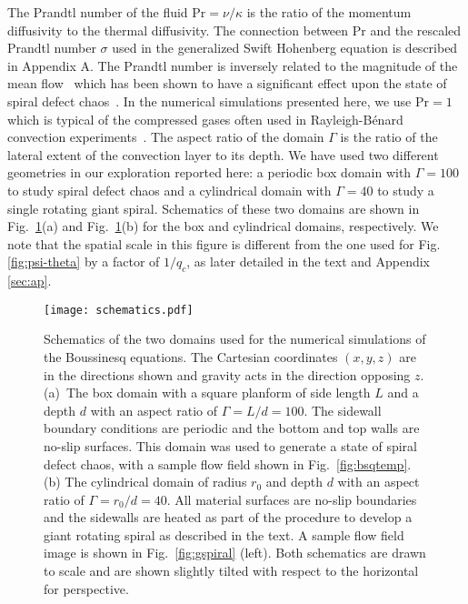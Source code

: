 \documentclass[preprint,prx,floatfix]{revtex4-1}
\begin{document}
The Prandtl number of the fluid $\text{Pr}= {\nu}/{\kappa}$ is the ratio of the momentum diffusivity to the thermal diffusivity. The connection between $\text{Pr}$ and the rescaled Prandtl number $\sigma$ used in the generalized Swift Hohenberg equation is described in Appendix A. The Prandtl number is inversely related to the magnitude of the mean flow~\cite{cross:1984,newell:1990:prl} which has been shown to have a significant effect upon the state of spiral defect chaos~\cite{assenheimer:1994,chiam:2003,karimi:2012,bodenschatz2000}. In the numerical simulations presented here, we use $\text{Pr}=1$ which is typical of the compressed gases often used in Rayleigh-B\'enard convection experiments~\cite{bodenschatz2000,morris1993spiral}.  The aspect ratio of the domain $\Gamma$ is the ratio of the lateral extent of the convection layer to its depth.  We have used two different geometries in our exploration reported here: a periodic box domain with $\Gamma=100$ to study spiral defect chaos and a cylindrical domain with $\Gamma=40$ to study a single rotating giant spiral.  Schematics of these two domains are shown in Fig.~\ref{fig:schematics}(a) and Fig.~\ref{fig:schematics}(b) for the box and cylindrical domains, respectively. We note that the spatial scale in this figure is different from the one used for Fig. \ref{fig:psi-theta} by a factor of $1/q_c$, as later detailed in the text and Appendix \ref{sec:ap}. %

\begin{figure}[ht]
\begin{center}
\texttt{[image: schematics.pdf]}
\end{center}
\caption{Schematics of the two domains used for the numerical simulations of the Boussinesq equations. The Cartesian coordinates $(x,y,z)$ are in the directions shown and gravity acts in the direction opposing $z$.  (a)~The box domain with a square planform of side length $L$ and a depth $d$ with an aspect ratio of $\Gamma = L/d = 100$. The sidewall boundary conditions are periodic and the bottom and top walls are no-slip surfaces. This domain was used to generate a state of spiral defect chaos, with a sample flow field shown in Fig.~\ref{fig:bsqtemp}. (b) The cylindrical domain of radius $r_0$ and depth $d$ with an aspect ratio of $\Gamma = r_0/d = 40$. All material surfaces are no-slip boundaries and the sidewalls are heated as part of the procedure to develop a giant rotating spiral as described in the text. A sample flow field image is shown in Fig.~\ref{fig:gspiral} (left). Both schematics are drawn to scale and are shown slightly tilted with respect to the horizontal for perspective.}
\label{fig:schematics}
\end{figure}
\end{document}
